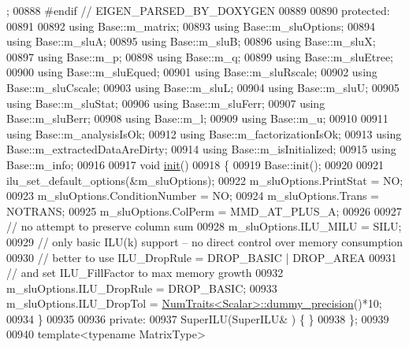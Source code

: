 \begin{DoxyCode}
      ;
00888 \textcolor{preprocessor}{    #endif // EIGEN\_PARSED\_BY\_DOXYGEN}
00889     
00890   \textcolor{keyword}{protected}:
00891     
00892     \textcolor{keyword}{using} Base::m\_matrix;
00893     \textcolor{keyword}{using} Base::m\_sluOptions;
00894     \textcolor{keyword}{using} Base::m\_sluA;
00895     \textcolor{keyword}{using} Base::m\_sluB;
00896     \textcolor{keyword}{using} Base::m\_sluX;
00897     \textcolor{keyword}{using} Base::m\_p;
00898     \textcolor{keyword}{using} Base::m\_q;
00899     \textcolor{keyword}{using} Base::m\_sluEtree;
00900     \textcolor{keyword}{using} Base::m\_sluEqued;
00901     \textcolor{keyword}{using} Base::m\_sluRscale;
00902     \textcolor{keyword}{using} Base::m\_sluCscale;
00903     \textcolor{keyword}{using} Base::m\_sluL;
00904     \textcolor{keyword}{using} Base::m\_sluU;
00905     \textcolor{keyword}{using} Base::m\_sluStat;
00906     \textcolor{keyword}{using} Base::m\_sluFerr;
00907     \textcolor{keyword}{using} Base::m\_sluBerr;
00908     \textcolor{keyword}{using} Base::m\_l;
00909     \textcolor{keyword}{using} Base::m\_u;
00910     
00911     \textcolor{keyword}{using} Base::m\_analysisIsOk;
00912     \textcolor{keyword}{using} Base::m\_factorizationIsOk;
00913     \textcolor{keyword}{using} Base::m\_extractedDataAreDirty;
00914     \textcolor{keyword}{using} Base::m\_isInitialized;
00915     \textcolor{keyword}{using} Base::m\_info;
00916 
00917     \textcolor{keywordtype}{void} \hyperlink{structinit}{init}()
00918     \{
00919       Base::init();
00920       
00921       ilu\_set\_default\_options(&m\_sluOptions);
00922       m\_sluOptions.PrintStat        = NO;
00923       m\_sluOptions.ConditionNumber  = NO;
00924       m\_sluOptions.Trans            = NOTRANS;
00925       m\_sluOptions.ColPerm          = MMD\_AT\_PLUS\_A;
00926       
00927       \textcolor{comment}{// no attempt to preserve column sum}
00928       m\_sluOptions.ILU\_MILU = SILU;
00929       \textcolor{comment}{// only basic ILU(k) support -- no direct control over memory consumption}
00930       \textcolor{comment}{// better to use ILU\_DropRule = DROP\_BASIC | DROP\_AREA}
00931       \textcolor{comment}{// and set ILU\_FillFactor to max memory growth}
00932       m\_sluOptions.ILU\_DropRule = DROP\_BASIC;
00933       m\_sluOptions.ILU\_DropTol = \hyperlink{group___core___module_struct_eigen_1_1_num_traits}{NumTraits<Scalar>::dummy\_precision}()*10;
00934     \}
00935     
00936   \textcolor{keyword}{private}:
00937     SuperILU(SuperILU& ) \{ \}
00938 \};
00939 
00940 \textcolor{keyword}{template}<\textcolor{keyword}{typename} MatrixType>

\end{DoxyCode}
